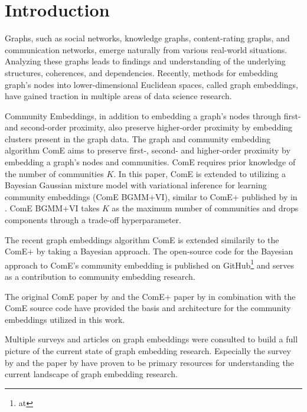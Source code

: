 \documentclass[conference]{IEEEtran}
\begin{document}
\section{Introduction}

Graphs, such as social networks, knowledge graphs, content-rating graphs, and communication networks, emerge naturally from various real-world situations. Analyzing these graphs leads to findings and understanding of the underlying structures, coherences, and dependencies. Recently, methods for embedding graph's nodes into lower-dimensional Euclidean spaces, called graph embeddings, have gained traction in multiple areas of data science research.\cite{Goyal_2018}

Community Embeddings, in addition to embedding a graph's nodes through first- and second-order proximity, also preserve higher-order proximity by embedding clusters present in the graph data. The graph and community embedding algorithm ComE aims to preserve first-, second- and higher-order proximity by embedding a graph's nodes and communities.\cite{ComE} ComE requires prior knowledge of the number of communities $K$. In this paper, ComE is extended to utilizing a Bayesian Gaussian mixture model with variational inference for learning community embeddings (ComE BGMM+VI), similar to ComE+ published by \citeauthor{ComE+} in \citeyear{ComE+}.\cite{ComE+} ComE BGMM+VI takes $K$ as the maximum number of communities and drops components through a trade-off hyperparameter.

The recent \citeyear{ComE} graph embeddings algorithm ComE is extended similarily to the \citeyear{ComE+} ComE+ by taking a Bayesian approach. The open-source code for the Bayesian approach to ComE's community embedding is published on GitHub\footnote{at } and serves as a contribution to community embedding research.\cite{ComE_BGMM_GH}

The original ComE paper  by \citeauthor{ComE} and the ComE+ paper  by \citeauthor{ComE+} in combination with the ComE source code have provided the basis and architecture for the community embeddings utilized in this work.\cite{ComE, ComE+, ComE_GH}

Multiple surveys and articles on graph embeddings were consulted to build a full picture of the current state of graph embedding research. Especially the \citeyear{Goyal_2018} survey  by \citeauthor{Goyal_2018} and the \citeyear{rossi20tkdd-roles} paper  by \citeauthor{rossi20tkdd-roles} have proven to be primary resources for understanding the current landscape of graph embedding research.\cite{Goyal_2018, rossi20tkdd-roles}
\end{document}

